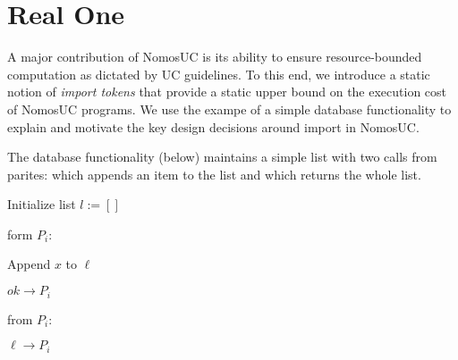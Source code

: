
\section{Real One}
A major contribution of NomosUC is its ability to ensure resource-bounded computation
as dictated by UC guidelines.
To this end, we introduce a static notion of \emph{import tokens} that provide a static upper
bound on the execution cost of NomosUC programs.
We use the exampe of a simple database functionality to explain and motivate the key design decisions around import in NomosUC.

The database functionality \Fdb (below) maintains a simple list with two calls from parites:  which appends an item to the list and  which returns the whole list. 
\begin{bbox}[title={Functionality $\F_{\msf{db}}$}]

Initialize list $l := []$

\OnInput {} form $P_i$:
	\begin{ritemize}
		\item Append $x$ to $\ell$
		\item \Send $ok \rightarrow P_i$
	\end{ritemize}

\OnInput {}from $P_i$:
	\begin{ritemize}
		\item \Send $\ell \rightarrow P_i$
	\end{ritemize}
\end{bbox}

